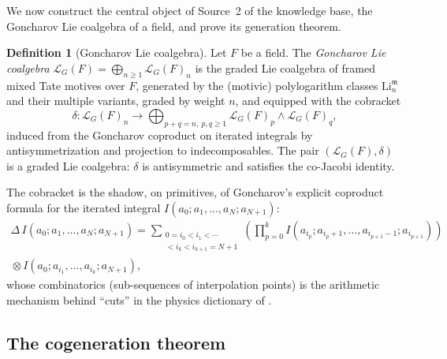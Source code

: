 \documentclass[12pt]{article}
\theoremstyle{definition}
\newtheorem{definition}[theorem]{Definition}
\theoremstyle{remark}
\newcommand{\LG}{\mathcal{L}_{G}}
\newcommand{\Li}{\mathrm{Li}}
\newcommand{\coA}{\Delta}
\newcommand{\cobr}{\delta}
\begin{document}
We now construct the central object of Source~2 of the knowledge base, the Goncharov
Lie coalgebra of a field, and prove its generation theorem.

\begin{definition}[Goncharov Lie coalgebra]
\label{def:GLC}
Let $F$ be a field. The \emph{Goncharov Lie coalgebra} $\LG(F)=\bigoplus_{n\ge 1}\LG(F)_n$ is
the graded Lie coalgebra of framed mixed Tate motives over $F$, generated by the (motivic)
polylogarithm classes $\Li_n^{\mathfrak{m}}$ and their multiple variants, graded by weight
$n$, and equipped with the cobracket
\begin{equation}
\label{eq:GLCcobracket}
\cobr\colon \LG(F)_n \longrightarrow \bigoplus_{p+q=n,\ p,q\ge 1}
\LG(F)_p\wedge\LG(F)_q,
\end{equation}
induced from the Goncharov coproduct on iterated integrals by antisymmetrization and
projection to indecomposables. The pair $(\LG(F),\cobr)$ is a graded Lie coalgebra: $\cobr$
is antisymmetric and satisfies the co-Jacobi identity.
\end{definition}

The cobracket is the shadow, on primitives, of Goncharov's explicit coproduct formula for
the iterated integral $I(a_0;a_1,\dots,a_N;a_{N+1})$:
\begin{multline}
\label{eq:goncharov-coproduct}
\coA\, I(a_0;a_1,\dots,a_N;a_{N+1})
=\sum_{\substack{0=i_0<i_1<\cdots\\ <i_k<i_{k+1}=N+1}}
\left(\prod_{p=0}^{k} I(a_{i_p};a_{i_p+1},\dots,a_{i_{p+1}-1};a_{i_{p+1}})\right)\\
{}\otimes I(a_0;a_{i_1},\dots,a_{i_k};a_{N+1}),
\end{multline}
whose combinatorics (sub-sequences of interpolation points) is the arithmetic
mechanism behind ``cuts'' in the physics dictionary of .

\subsection{The cogeneration theorem}
\end{document}
